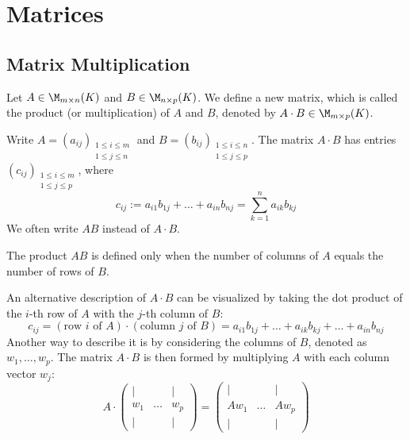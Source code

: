\setcounter{chapter}{16}
\chapter{Matrices}

\section{Matrix Multiplication}

\begin{definition}
Let $A \in \M_{m \times n}(K)$ and $B \in \M_{n \times p}(K)$. We define a new matrix, which is called the product (or multiplication) of $A$ and $B$, denoted by $A \cdot B \in \M_{m \times p}(K)$.

Write $A = (a_{ij})_{\substack{1 \le i \le m \\ 1 \le j \le n}}$ and $B = (b_{ij})_{\substack{1 \le i \le n \\ 1 \le j \le p}}$. The matrix $A \cdot B$ has entries $(c_{ij})_{\substack{1 \le i \le m \\ 1 \le j \le p}}$, where
\begin{equation*}
    c_{ij} := a_{i1}b_{1j} + \dots + a_{in}b_{nj} = \sum_{k=1}^{n} a_{ik}b_{kj}
\end{equation*}
We often write $AB$ instead of $A \cdot B$. 
\end{definition}

\begin{importantremark}
The product $AB$ is defined only when the number of columns of $A$ equals the number of rows of $B$.
\end{importantremark}

An alternative description of $A \cdot B$ can be visualized by taking the dot product of the $i$-th row of $A$ with the $j$-th column of $B$:
\begin{equation*}
    c_{ij} = (\text{row } i \text{ of } A) \cdot (\text{column } j \text{ of } B) = a_{i1}b_{1j} + \dots + a_{ik}b_{kj} + \dots + a_{in}b_{nj}
\end{equation*}
Another way to describe it is by considering the columns of $B$, denoted as $w_1, \dots, w_p$. The matrix $A \cdot B$ is then formed by multiplying $A$ with each column vector $w_j$:
\begin{equation*}
    A \cdot \begin{pmatrix} | & & | \\ w_1 & \dots & w_p \\ | & & | \end{pmatrix} = \begin{pmatrix} | & & | \\ A w_1 & \dots & A w_p \\ | & & | \end{pmatrix}
\end{equation*}

